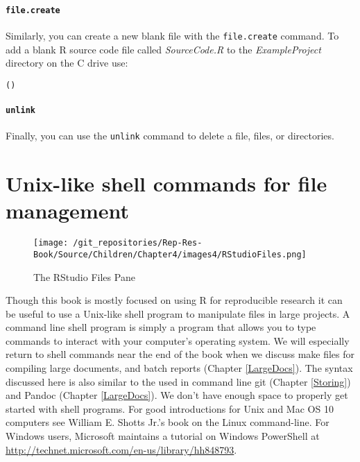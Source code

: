 {\paragraph{{\tt{file.create}}}

Similarly, you can create a new blank file with the \texttt{file.create} command. To add a blank R source code file called {\emph{SourceCode.R}} to the {\emph{ExampleProject}} directory on the C drive use:

\begin{knitrout}
\color{fgcolor}\begin{kframe}
\begin{alltt}
()
\end{alltt}
\end{kframe}
\end{knitrout}


\paragraph{{\tt{unlink}}}

Finally, you can use the {\tt{unlink}} command to delete a file, files, or directories. 

\section{Unix-like shell commands for file management} 


\begin{wrapfigure}{r}{0.5\textwidth}
    \caption{The RStudio Files Pane} %
    \label{FilesPane}
        \begin{center}    
        \texttt{[image: /git\_repositories/Rep-Res-Book/Source/Children/Chapter4/images4/RStudioFiles.png]}
        \end{center}
\end{wrapfigure}

Though this book is mostly focused on using R for reproducible research it can be useful to use a Unix-like shell program to manipulate files in large projects. A command line shell program is simply a program that allows you to type commands to interact with your computer's operating system. We will especially return to shell commands near the end of the book when we discuss make files for compiling large documents, and batch reports (Chapter \ref{LargeDocs}). The syntax discussed here is also similar to the used in command line git (Chapter \ref{Storing}) and Pandoc (Chapter \ref{LargeDocs}). We don't have enough space to properly get started with shell programs. For good introductions for Unix and Mac OS 10 computers see William E. Shotts Jr.'s book on the Linux command-line\cite[]{ShottsJr2012}. For Windows users, Microsoft maintains a tutorial on Windows PowerShell at \url{http://technet.microsoft.com/en-us/library/hh848793}.

}
